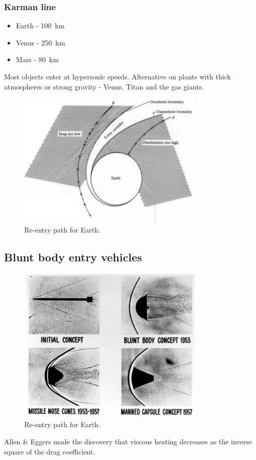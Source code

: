 \subsubsection{Karman line}
\begin{itemize}
    \item Earth - \SI{100}{\kilo\meter}
    \item Venus - \SI{250}{\kilo\meter}
    \item Mars - \SI{80}{\kilo\meter}
\end{itemize}
Most objects enter at hypersonic speeds. Alternative on plants with thick atmospheres or strong gravity - Venus, Titan and the gas giants.
\begin{figure}[H]
    \centering
    \includegraphics[width =0.8\textwidth]{img/figure37.png}
    \caption{Re-entry path for Earth.}
\end{figure}
\subsection{Blunt body entry vehicles}
\begin{figure}[H]
    \centering
    \includegraphics[width =0.8\textwidth]{img/figure38.png}
    \caption{Re-entry path for Earth.}
\end{figure}
Allen \& Eggers made the discovery that viscous heating decreases as the inverse square of the drag coefficient.
